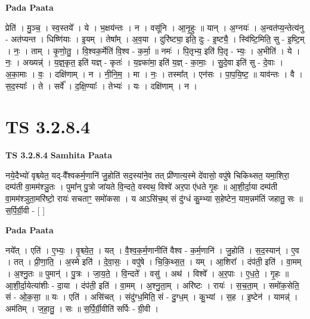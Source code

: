 \documentclass[17pt]{extarticle}
\begin{document}
\textbf{Pada Paata} \newline

प्रेति॑ । मु॒ञ्च॒ । स्व॒स्तये᳚ । ये । भ॒क्षय॑न्तः । न । वसू॑नि । आ॒नृ॒हुः ॥ यान् । अ॒ग्नयः॑ । अ॒न्वत॑प्य॒न्तेत्य॑नु - अत॑प्यन्त । धिष्णि॑याः । इ॒यम् । तेषा᳚म् । अ॒व॒या । दुरि॑ष्ट्या॒ इति॒ दुः - इ॒ष्ट्यै॒ । स्वि॑ष्टि॒मिति॒ सु - इ॒ष्टि॒म् । नः॒ । ताम् । कृ॒णो॒तु॒ । वि॒श्वक॒र्मेति॑ वि॒श्व - क॒र्मा॒ ॥ नमः॑ । पि॒तृभ्य॒ इति॑ पि॒तृ - भ्यः॒ । अ॒भीति॑ । ये । नः॒ । अख्यन्न्॑ । य॒ज्ञ्॒कृत॒ इति॑ यज्ञ् - कृतः॑ । य॒ज्ञ्का॑मा॒ इति॑ य॒ज्ञ् - का॒माः॒ । सु॒दे॒वा इति॑ सु - दे॒वाः । अ॒का॒माः । वः॒ । दक्षि॑णाम् । न । नी॒नि॒म॒ । मा । नः॒ । तस्मा᳚त् । एन॑सः । पा॒प॒यि॒ष्ट॒ ॥ याव॑न्तः । वै । स॒द॒स्याः᳚ । ते । सर्वे᳚ । द॒क्षि॒ण्याः᳚ । तेभ्यः॑ । यः । दक्षि॑णाम् । न ।  \newline




\section*{ TS 3.2.8.4 }

\textbf{TS 3.2.8.4 } \newline
\textbf{Samhita Paata} \newline

नये॒दैभ्यो॑ वृश्च्येत॒ यद्-वै᳚श्वकर्म॒णानि॑ जु॒होति॑ सद॒स्या॑ने॒व तत् प्री॑णात्य॒स्मे दे॑वासो॒ वपु॑षे चिकिथ्सत॒ यमा॒शिरा॒ दम्प॑ती वा॒मम॑श्ञु॒तः । पुमा᳚न् पु॒त्रो जा॑यते वि॒न्दते॒ वस्वथ॒ विश्वे॑ अर॒पा ए॑धते गृ॒हः ॥ आ॒शी॒र्दा॒या दम्प॑ती वा॒मम॑श्ञुता॒मरि॑ष्टो॒ रायः॑ सचताꣳ॒॒ समो॑कसा । य आऽसि॑च॒थ् सं दु॑ग्धं कु॒म्भ्या स॒हेष्टेन॒ याम॒न्नम॑तिं जहातु॒ सः ॥ स॒र्पि॒र्ग्री॒वी - [  ] \newline

\textbf{Pada Paata} \newline

नये᳚त् । एति॑ । ए॒भ्यः॒ । वृ॒श्च्ये॒त॒ । यत् । वै॒श्व॒क॒र्म॒णानीति॑ वैश्व - क॒र्म॒णानि॑ । जु॒होति॑ । स॒द॒स्यान्॑ । ए॒व । तत् । प्री॒णा॒ति॒ । अ॒स्मे इति॑ । दे॒वा॒सः॒ । वपु॑षे । चि॒कि॒थ्स॒त॒ । यम् । आ॒शिरा᳚ । दंप॑ती॒ इति॑ । वा॒मम् । अ॒श्नु॒तः ॥ पुमान्॑ । पु॒त्रः । जा॒य॒ते॒ । वि॒न्दते᳚ । वसु॑ । अथ॑ । विश्वे᳚ । अ॒र॒पाः । ए॒ध॒ते॒ । गृ॒हः ॥ आ॒शी॒र्दा॒येत्या॑शीः - दा॒या । दंप॑ती॒ इति॑ । वा॒मम् । अ॒श्नु॒ता॒म् । अरि॑ष्टः । रायः॑ । स॒च॒ता॒म् । समो॑क॒सेति॒ सं - ओ॒क॒सा॒ ॥ यः । एति॑ । असि॑चत् । संदु॑ग्ध॒मिति॒ सं - दु॒ग्ध॒म् । कु॒भ्यां । स॒ह । इ॒ष्टेन॑ । यामन्न्॑ । अम॑तिम् । ज॒हा॒तु॒ । सः ॥ स॒र्पि॒र्ग्री॒वीति॑ सर्पिः - ग्री॒वी ।  \newline
\end{document}

